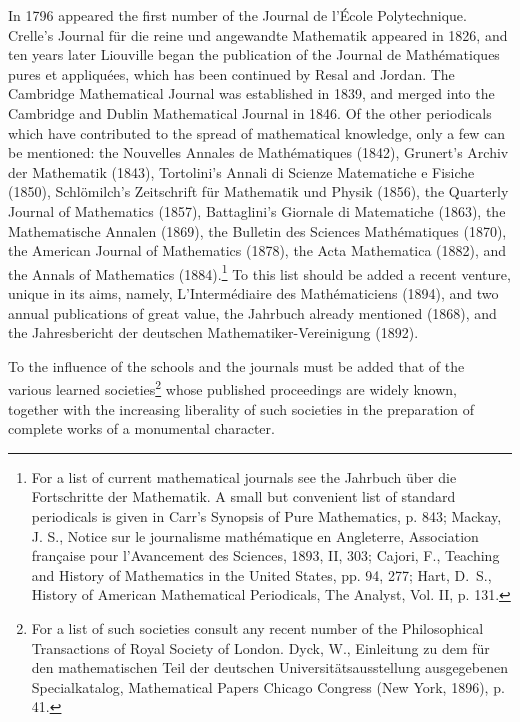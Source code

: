 \documentclass[oneside]{book}
\begin{document}
In 1796 appeared the first number of the Journal de l'\'Ecole
Polytechnique. Crelle's Journal f\"ur die reine und angewandte
Mathematik appeared in 1826, and ten years later Liouville began the
publication of the Journal de Math\'ematiques pures et appliqu\'ees,
which has been continued by Resal and Jordan. The Cambridge
Mathematical Journal was established in 1839, and merged into the
Cambridge and Dublin Mathematical Journal in 1846. Of the other
periodicals which have contributed to the spread of mathematical
knowledge, only a few can be mentioned: the Nouvelles Annales de
Math\'ematiques (1842), Grunert's Archiv der Mathematik (1843),
Tortolini's Annali di Scienze Matematiche e Fisiche (1850),
Schl\"omilch's Zeitschrift f\"ur Mathematik und Physik (1856), the
Quarterly Journal of Mathematics (1857), Battaglini's Giornale di
Matematiche (1863), the Mathematische Annalen (1869), the Bulletin
des Sciences Math\'ematiques (1870), the American Journal of
Mathematics (1878), the Acta Mathematica (1882), and the Annals of
Mathematics (1884).\footnote{For a list of current mathematical
journals see the Jahrbuch \"uber die Fortschritte der Mathematik. A
small but convenient list of standard periodicals is given in Carr's
Synopsis of Pure Mathematics, p. 843; Mackay, J. S., Notice sur le
journalisme math\'ematique en Angleterre, Association fran\c{c}aise
pour l'Avancement des Sciences, 1893, II, 303; Cajori, F., Teaching
and History of Mathematics in the United States, pp. 94, 277;
Hart, D.~S., History of American Mathematical Periodicals, The Analyst,
Vol. II, p. 131.} To this list should be added a recent venture,
unique in its aims, namely, L'Interm\'ediaire des Math\'ematiciens
(1894), and two annual publications of great value, the Jahrbuch
already mentioned (1868), and the Jahresbericht der deutschen
Math\-e\-ma\-tik\-er-Vereinigung (1892).

To the influence of the schools and the journals must be added that
of the various learned societies\footnote{For a list of such
societies consult any recent number of the Philosophical
Transactions of Royal Society of London. Dyck, W., Einleitung zu dem
f\"ur den mathematischen Teil der deutschen
Universit\"atsausstellung ausgegebenen Specialkatalog, Mathematical
Papers Chicago Congress (New York, 1896), p. 41.} whose published
proceedings are widely known, together with the increasing
liberality of such societies in the preparation of complete works of
a monumental character.
\end{document}
